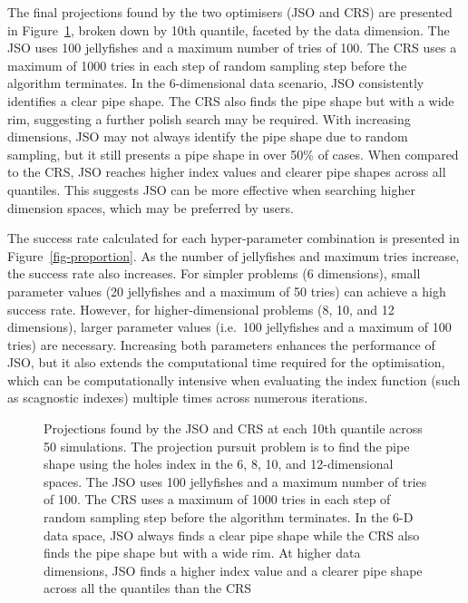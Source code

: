 \documentclass[
  number,
  preprint,
  3p]{elsarticle}
\begin{document}
The final projections found by the two optimisers (JSO and CRS) are
presented in Figure~\ref{fig-proj}, broken down by 10th quantile,
faceted by the data dimension. The JSO uses 100 jellyfishes and a
maximum number of tries of 100. The CRS uses a maximum of 1000 tries in
each step of random sampling step before the algorithm terminates. In
the 6-dimensional data scenario, JSO consistently identifies a clear
pipe shape. The CRS also finds the pipe shape but with a wide rim,
suggesting a further polish search may be required. With increasing
dimensions, JSO may not always identify the pipe shape due to random
sampling, but it still presents a pipe shape in over 50\% of cases. When
compared to the CRS, JSO reaches higher index values and clearer pipe
shapes across all quantiles. This suggests JSO can be more effective
when searching higher dimension spaces, which may be preferred by users.

The success rate calculated for each hyper-parameter combination is
presented in Figure~\ref{fig-proportion}. As the number of jellyfishes
and maximum tries increase, the success rate also increases. For simpler
problems (6 dimensions), small parameter values (20 jellyfishes and a
maximum of 50 tries) can achieve a high success rate. However, for
higher-dimensional problems (8, 10, and 12 dimensions), larger parameter
values (i.e.~100 jellyfishes and a maximum of 100 tries) are necessary.
Increasing both parameters enhances the performance of JSO, but it also
extends the computational time required for the optimisation, which can
be computationally intensive when evaluating the index function (such as
scagnostic indexes) multiple times across numerous iterations.

\begin{figure}


\caption{\label{fig-proj}Projections found by the JSO and CRS at each
10th quantile across 50 simulations. The projection pursuit problem is
to find the pipe shape using the holes index in the 6, 8, 10, and
12-dimensional spaces. The JSO uses 100 jellyfishes and a maximum number
of tries of 100. The CRS uses a maximum of 1000 tries in each step of
random sampling step before the algorithm terminates. In the 6-D data
space, JSO always finds a clear pipe shape while the CRS also finds the
pipe shape but with a wide rim. At higher data dimensions, JSO finds a
higher index value and a clearer pipe shape across all the quantiles
than the CRS}

\end{figure}%
\end{document}
